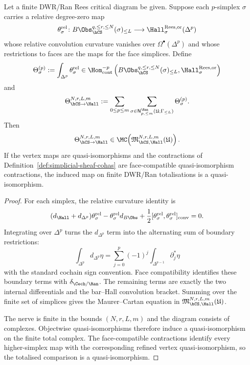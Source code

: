 \begin{proposition}
\label{prop:descent-reduction}
Let a finite DWR/Ran Rees critical diagram be given. Suppose each
$p$-simplex $\sigma$ carries a relative degree-zero map
\[
 \theta_\sigma^{\mathrm{rel}}\colon
 B\Obs_{\hCS}^{q,\le r,\le N}(\sigma)_{\le L}
 \longrightarrow
 \Hall_{\sigma}^{\mathrm{Rees},\mathrm{or}}(\Delta^p)
\]
whose relative convolution curvature vanishes over
$\Omega^\bullet(\Delta^p)$ and whose restrictions to faces are the
maps for the face simplices. Define
\[
 \Theta_\sigma^{(p)}
 :=
 \int_{\Delta^p}\theta_\sigma^{\mathrm{rel}}
 \in
 \Hom_{\mathrm{cont}}^{-p}
 \left(
 B\Obs_{\hCS}^{q,\le r,\le N}(\sigma)_{\le L},
 \Hall_{\sigma}^{\mathrm{Rees},\mathrm{or}}
 \right)
\]
and
\[
 \Theta^{N,r,L,m}_{\hCS\to\Hall}
 :=
 \sum_{0\le p\le m}
 \sum_{\sigma\in
 \mathsf N^{\Ran}_{p,\le m}(\mathfrak U;\Gamma_{\le L})}
 \Theta_\sigma^{(p)}.
\]
Then
\[
 \Theta^{N,r,L,m}_{\hCS\to\Hall}
 \in
 \MC\!\left(
 \mathfrak M_{\hCS,\Hall}^{N,r,L,m}(\mathfrak U)
 \right).
\]
If the vertex maps are quasi-isomorphisms and the contractions of
Definition~\ref{def:simplicial-sheaf-cohas} are face-compatible
quasi-isomorphism contractions, the induced map on finite DWR/Ran
totalisations is a quasi-isomorphism.
\end{proposition}

\begin{proof}
For each simplex, the relative curvature identity is
\[
 (d_{\Hall}+d_{\Delta^p})\theta_\sigma^{\mathrm{rel}}
 -\theta_\sigma^{\mathrm{rel}}d_{B\Obs}
 +\frac12[\theta_\sigma^{\mathrm{rel}},
 \theta_\sigma^{\mathrm{rel}}]_{\mathrm{conv}}=0.
\]
Integrating over $\Delta^p$ turns the $d_{\Delta^p}$ term into the
alternating sum of boundary restrictions:
\[
 \int_{\Delta^p}d_{\Delta^p}\eta
 =
 \sum_{j=0}^p(-1)^j
 \int_{\Delta^{p-1}}\partial_j^*\eta
\]
with the standard cochain sign convention. Face compatibility
identifies these boundary terms with $\delta_{\Cech/\Ran}$. The
remaining terms are exactly the two internal differentials and the
bar--Hall convolution bracket. Summing over the finite set of
simplices gives the Maurer--Cartan equation in
$\mathfrak M_{\hCS,\Hall}^{N,r,L,m}(\mathfrak U)$.

The nerve is finite in the bounds $(N,r,L,m)$ and the diagram consists
of complexes. Objectwise quasi-isomorphisms therefore induce a
quasi-isomorphism on the finite total complex. The face-compatible
contractions identify every higher-simplex map with the corresponding
refined vertex quasi-isomorphism, so the totalised comparison is a
quasi-isomorphism.
\end{proof}

